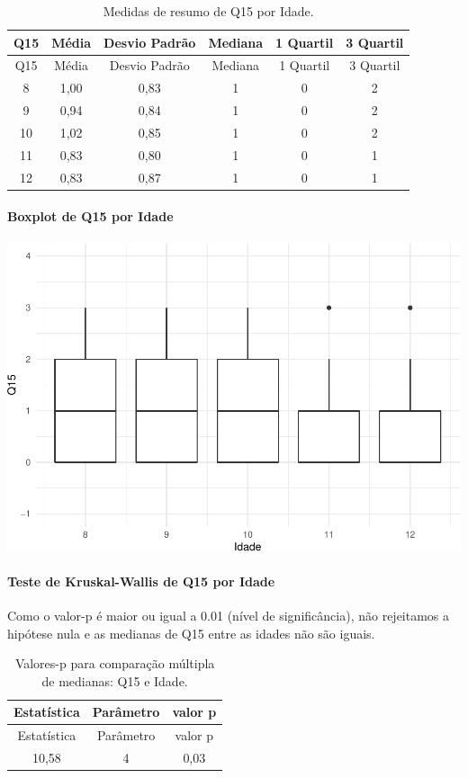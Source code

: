 \documentclass[]{article}
\let\oldparagraph\paragraph
\renewcommand{\paragraph}[1]{\oldparagraph{#1}\mbox{}}
\begin{document}
\begin{longtable}[]{@{}cccccc@{}}
\caption{\label{tab:unnamed-chunk-95}Medidas de resumo de Q15 por Idade.}\tabularnewline
\toprule
Q15 & Média & Desvio Padrão & Mediana & 1 Quartil & 3 Quartil\tabularnewline
\midrule
\endfirsthead
\toprule
Q15 & Média & Desvio Padrão & Mediana & 1 Quartil & 3 Quartil\tabularnewline
\midrule
\endhead
8 & 1,00 & 0,83 & 1 & 0 & 2\tabularnewline
9 & 0,94 & 0,84 & 1 & 0 & 2\tabularnewline
10 & 1,02 & 0,85 & 1 & 0 & 2\tabularnewline
11 & 0,83 & 0,80 & 1 & 0 & 1\tabularnewline
12 & 0,83 & 0,87 & 1 & 0 & 1\tabularnewline
\bottomrule
\end{longtable}

\hypertarget{boxplot-de-q15-por-idade}{%
\paragraph{Boxplot de Q15 por Idade}\label{boxplot-de-q15-por-idade}}

\begin{center}\includegraphics[width=0.75\linewidth]{relatorio_covid19_files/figure-latex/unnamed-chunk-96-1} \end{center}

\hypertarget{teste-de-kruskal-wallis-de-q15-por-idade}{%
\paragraph{Teste de Kruskal-Wallis de Q15 por Idade}\label{teste-de-kruskal-wallis-de-q15-por-idade}}

Como o valor-p é maior ou igual a 0.01 (nível de significância), não rejeitamos a hipótese nula e as medianas de Q15 entre as idades não são iguais.

\begin{longtable}[]{@{}ccc@{}}
\caption{\label{tab:unnamed-chunk-98}Valores-p para comparação múltipla de medianas: Q15 e Idade.}\tabularnewline
\toprule
Estatística & Parâmetro & valor p\tabularnewline
\midrule
\endfirsthead
\toprule
Estatística & Parâmetro & valor p\tabularnewline
\midrule
\endhead
10,58 & 4 & 0,03\tabularnewline
\bottomrule
\end{longtable}
\end{document}
